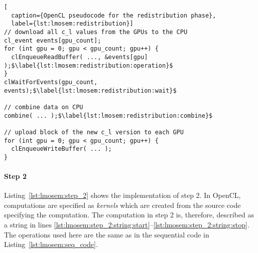 \begin{lstlisting}[
  caption={OpenCL pseudocode for the redistribution phase},
  label={lst:lmosem:redistribution}]
// download all c_l values from the GPUs to the CPU
cl_event events[gpu_count];
for (int gpu = 0; gpu < gpu_count; gpu++) {
  clEnqueueReadBuffer( ..., &events[gpu] );$\label{lst:lmosem:redistribution:operation}$
}
clWaitForEvents(gpu_count, events);$\label{lst:lmosem:redistribution:wait}$

// combine data on CPU
combine( ... );$\label{lst:lmosem:redistribution:combine}$

// upload block of the new c_l version to each GPU
for (int gpu = 0; gpu < gpu_count; gpu++) {
  clEnqueueWriteBuffer( ... );
}
\end{lstlisting}

\paragraph{Step 2}
Listing~\ref{lst:lmosem:step_2} shows the implementation of step 2.
In OpenCL, computations are specified as \emph{kernels} which are created from the source code specifying the computation.
The computation in step 2 is, therefore, described as a string in lines \ref{lst:lmosem:step_2:string:start}--\ref{lst:lmosem:step_2:string:stop}.
The operations used here are the same as in the sequential code in Listing~\ref{lst:lmosem:seq_code}.


